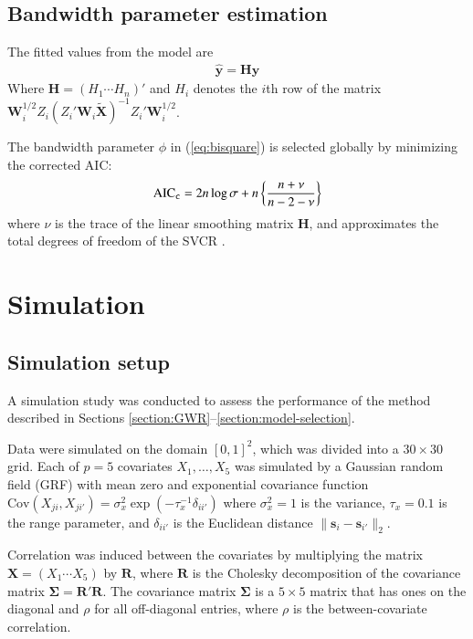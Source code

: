 \documentclass[authoryear, review, 11pt]{elsarticle}
\begin{document}
	\subsection{Bandwidth parameter estimation}
		The fitted values from the model are	
	\begin{align}
		\hat{\bm{y}} = \bm{H} \bm{y}
	\end{align}
	Where $\bm{H} = \left(H_1 \cdots H_n \right)'$ and $H_i$ denotes the $i$th row of the matrix $\bm{W}_i^{1/2} Z_i \left( Z_i'\bm{W}_i \tilde{\bm{X}} \right)^{-1} Z_i'\bm{W}_i^{1/2}$.
	
	The bandwidth parameter $\phi$ in (\ref{eq:bisquare}) is selected globally by minimizing the corrected AIC:	
	\begin{align}\label{eq:AICc}
		\text{AIC}_{\tt c} = 2 n \log{\sigma} + n \left\{\frac{n + \nu}{n - 2 - \nu}\right\}
	\end{align}	
	where $\nu$ is the trace of the linear smoothing matrix $\bm{H}$, and approximates the total degrees of freedom of the SVCR \citep{Hurvich:1998}.


\section{Simulation \label{section:simulation}}
	\subsection{Simulation setup}
	A simulation study was conducted to assess the performance of the method described in Sections \ref{section:GWR}--\ref{section:model-selection}. 
	
	Data were simulated on the domain $[0,1]^2$, which was divided into a $30 \times 30$ grid. Each of $p=5$ covariates $X_1, \dots, X_5$ was simulated by a Gaussian random field (GRF) with mean zero and exponential covariance function $\text{Cov} \left(X_{ji}, X_{ji'} \right) = \sigma_x^2 \exp{\left( -\tau_x^{-1} \delta_{ii'} \right)}$ where $\sigma_x^2=1$ is the variance, $\tau_x = 0.1$ is the range parameter, and $\delta_{ii'}$ is the Euclidean distance $\|\bm{s}_i - \bm{s}_{i'}\|_2$.
	
	Correlation was induced between the covariates by multiplying the matrix $\bm{X} = \left(X_1 \cdots X_5\right)$ by $\bm{R}$, where $\bm{R}$ is the Cholesky decomposition of the covariance matrix $\bm{\Sigma} = \bm{R}'\bm{R}$. The covariance matrix $\bm{\Sigma}$ is a $5 \times 5$ matrix that has ones on the diagonal and $\rho$ for all off-diagonal entries, where $\rho$ is the between-covariate correlation.
		
\end{document}
